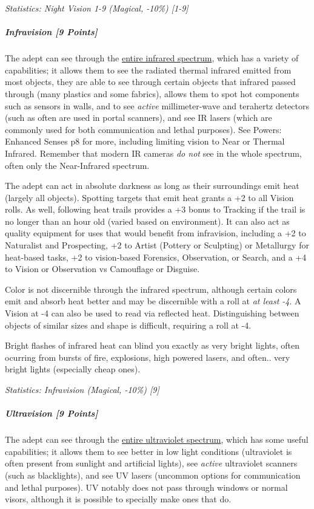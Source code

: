 \begin{multicols*}{3}
		\textcolor{OliveGreen}{\textit{Statistics: Night Vision 1-9 (Magical, -10\%) [1-9]}}
		
	\subparagraph{Infravision [9 Points]}
	
		The adept can see through the \textcolor{NavyBlue}{\href{https://en.wikipedia.org/wiki/Infrared}{entire infrared spectrum}}, which has a variety of capabilities; it allows them to see the radiated thermal infrared emitted from most objects, they are able to see through certain objects that infrared passed through (many plastics and some fabrics), allows them to spot hot components such as sensors in walls, and to see \textit{active} millimeter-wave and terahertz detectors (such as often are used in portal scanners), and see IR lasers (which are commonly used for both communication and lethal purposes). See Powers: Enhanced Senses p8 for more, including limiting vision to Near or Thermal Infrared. Remember that modern IR cameras \textit{do not} see in the whole spectrum, often only the Near-Infrared spectrum.
		
		The adept can act in absolute darkness as long as their surroundings emit heat (largely all objects). Spotting targets that emit heat grants a +2 to all Vision rolls. As well, following heat trails provides a +3 bonus to Tracking if the trail is no longer than an hour old (varied based on environment). It can also act as quality equipment for uses that would benefit from infravision, including a +2 to Naturalist and Prospecting, +2 to Artist (Pottery or Sculpting) or Metallurgy for heat-based tasks, +2 to vision-based Forensics, Observation, or Search, and a +4 to Vision or Observation vs Camouflage or Disguise.
		
		Color is not discernible through the infrared spectrum, although certain colors emit and absorb heat better and may be discernible with a roll at \textit{at least -4}. A Vision at -4 can also be used to read via reflected heat. Distinguishing between objects of similar sizes and shape is difficult, requiring a roll at -4. 
		
		Bright flashes of infrared heat can blind you exactly as very bright lights, often ocurring from bursts of fire, explosions, high powered lasers, and often.. very bright lights (especially cheap ones).
	
		\textcolor{OliveGreen}{\textit{Statistics: Infravision (Magical, -10\%) [9] }}
			
	\subparagraph{Ultravision [9 Points]}
	
		The adept can see through the \textcolor{NavyBlue}{\href{https://en.wikipedia.org/wiki/Ultraviolet}{entire ultraviolet spectrum}}, which has some useful capabilities; it allows them to see better in low light conditions (ultraviolet is often present from sunlight and artificial lights), see \textit{active} ultraviolet scanners (such as blacklights), and see UV lasers (uncommon options for communication and lethal purposes). UV notably does not pass through windows or normal visors, although it is possible to specially make ones that do.
		

\end{multicols*}
